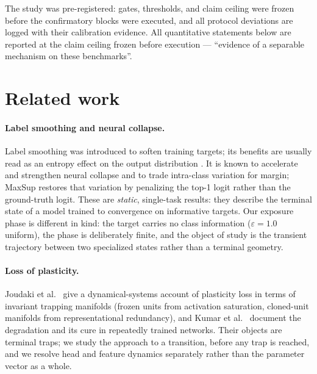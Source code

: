 \documentclass[review,12pt]{elsarticle}
\begin{document}
The study was pre-registered: gates, thresholds, and claim ceiling were frozen
before the confirmatory blocks were executed, and all protocol deviations are
logged with their calibration evidence. All quantitative statements below are
reported at the claim ceiling frozen before execution --- ``evidence of a
separable mechanism on these benchmarks''.

\section{Related work}
\label{sec:related}

\paragraph{Label smoothing and neural collapse.}
Label smoothing \cite{szegedy2016rethinking} was introduced to soften training
targets; its benefits are usually read as an entropy effect on the output
distribution \cite{muller2019label,meister2020generalized}. It is known to
accelerate and strengthen neural collapse
\cite{papyan2020prevalence,guo2025cross} and to trade
intra-class variation for margin; MaxSup \cite{wang2025maxsup} restores that
variation by penalizing the top-1 logit rather than the ground-truth logit.
These are \emph{static}, single-task results: they describe the terminal state
of a model trained to convergence on informative targets. Our exposure phase is
different in kind: the target carries no class information
($\varepsilon=1.0$ uniform), the phase is deliberately finite, and the object of
study is the transient trajectory between two specialized states rather than a
terminal geometry.

\paragraph{Loss of plasticity.}
Joudaki et al.~\cite{joudaki2026barriers} give a dynamical-systems account of
plasticity loss in terms of invariant trapping manifolds (frozen units from
activation saturation, cloned-unit manifolds from representational
redundancy), and Kumar et al.~\cite{kumar2022loss} document the degradation
and its cure in repeatedly trained networks. Their objects are terminal traps;
we study the approach to a transition, before any trap is reached, and we
resolve head and feature dynamics separately rather than the parameter vector
as a whole.
\end{document}
